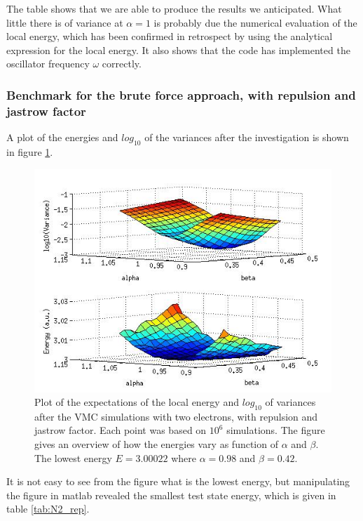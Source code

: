 The table shows that we are able to produce the results we anticipated.
What little there is of variance at $\alpha=1$ is probably due the numerical evaluation of the local energy, which has been confirmed in retrospect by using the analytical expression for the local energy. 
It also shows that the code has implemented the oscillator frequency $\omega$ correctly. 










\subsubsection{Benchmark for the brute force approach, with repulsion and jastrow factor}\label{sec:N2_rep}

A plot of the energies and $log_{10}$ of the variances after the investigation is shown in figure \ref{fig:N2_rep}.

\begin{figure}[h!]
	\centering
	\includegraphics[width=\textwidth]{results/N2_rep.jpg}
	\caption{Plot of the expectations of the local energy and $log_{10}$ of variances after the VMC simulations with two electrons, with repulsion and jastrow factor. 
	Each point was based on $10^6$ simulations. 
	The figure gives an overview of how the energies vary as function of $\alpha$ and $\beta$.
	The lowest energy $E= 3.00022$ where $\alpha = 0.98$ and $\beta = 0.42$.}
	\label{fig:N2_rep}
\end{figure}

It is not easy to see from the figure what is the lowest energy, but manipulating the figure in matlab revealed the smallest test state energy, which is given in table \ref{tab:N2_rep}.

